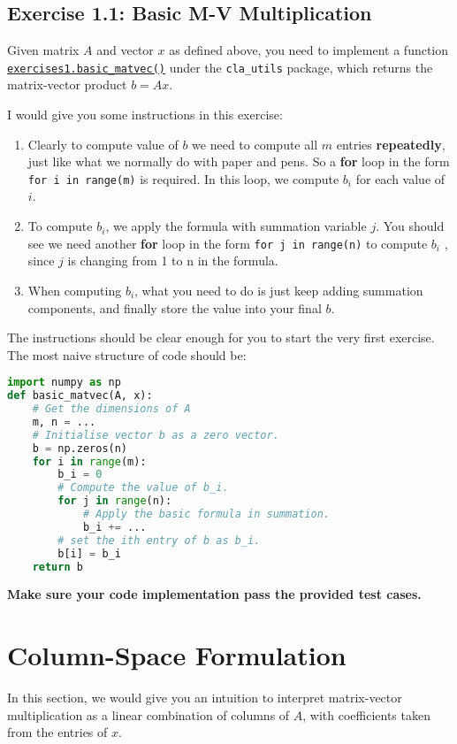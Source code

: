 \subsection*{Exercise 1.1: Basic M-V Multiplication}
\begin{problem}
  Given matrix $A$ and vector $x$ as defined above, you need to implement a function \href{https://comp-lin-alg.github.io/cla_utils.html#cla_utils.exercises1.basic_matvec}{\texttt{exercises1.basic\_matvec()}}
under the \texttt{cla\_utils} package, which returns the matrix-vector product $b = Ax$.
\end{problem}
\noindent I would give you some instructions in this exercise:
\begin{enumerate}
  \item Clearly to compute value of \(b\)  we need to compute all \(m\)  entries \textbf{repeatedly}, just like what we normally do with paper and pens. So a \textbf{for} loop in the form \texttt{for i in range(m)} is required. In this loop, we compute \(b_i\) for each value of \(i\).
  \item To compute \(b_i\), we apply the formula with summation variable \(j\). You should see we need another \textbf{for} loop in the form \texttt{for j in range(n)} to compute \(b_i\)  , since \(j\) is changing from 1 to n in the formula. 
  \item When computing \(b_i\), what you need to do is just keep adding summation components, and finally store the value into your final \(b\). \checked
\end{enumerate}
The instructions should be clear enough for you to start the very first exercise. The most naive structure of code should be:
\begin{lstlisting}[language=Python]
import numpy as np
def basic_matvec(A, x):
    # Get the dimensions of A
    m, n = ...
    # Initialise vector b as a zero vector.
    b = np.zeros(n)
    for i in range(m):
        b_i = 0
        # Compute the value of b_i.
        for j in range(n):
            # Apply the basic formula in summation.
            b_i += ...
        # set the ith entry of b as b_i.
        b[i] = b_i
    return b
\end{lstlisting}
\textbf{Make sure your code implementation pass the provided test cases.}
\section{Column-Space Formulation}
\label{sec1.2}
In this section, we would give you an intuition to interpret matrix-vector multiplication as a linear combination of columns of $A$, with coefficients taken from the entries of $x$.
